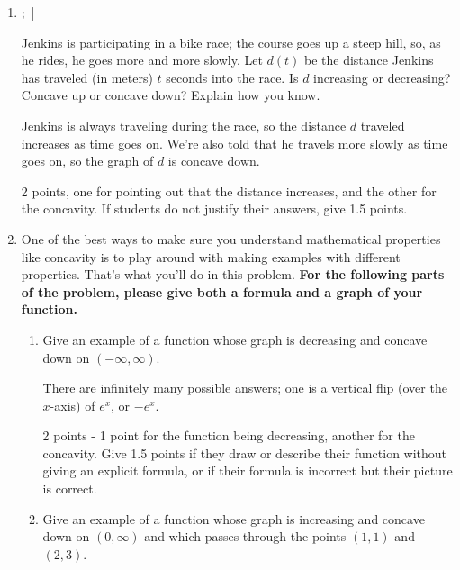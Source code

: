 \documentclass[10pt]{article}
\DeclareRobustCommand{\numbox}[1]{\tikz[overlay, baseline=-10pt, trapezium stretches=true] \node[trapezium, trapezium left angle=45, trapezium right angle=90, shape border rotate=90, anchor=north, text depth=1cm, inner ysep=8pt, fill=color1, text=white, font=\Large]{#1}; \,}
\DeclareRobustCommand{\shortnumbox}[1]{\tikz[overlay, baseline=-10pt, trapezium stretches=true] \node[trapezium, trapezium left angle=45, trapezium right angle=90, shape border rotate=90, anchor=north, inner ysep=8pt, fill=color1, text=white, font=\Large]{#1}; \,}
\begin{document}
\begin{enumerate}[leftmargin=*, label=\numbox{\arabic*}]
\item[\refstepcounter{enumi}\shortnumbox{\number\value{enumi}}]
    \begin{problem}
        Jenkins is participating in a bike race; the course goes up a steep
        hill, so, as he rides, he goes more and more slowly.  Let $d(t)$ be
        the distance Jenkins has traveled (in meters) $t$ seconds into the
        race.  Is $d$ increasing or decreasing?  Concave up or concave down?
        Explain how you know.
    \end{problem}

    \begin{solution}
        Jenkins is always traveling during the race, so the distance $d$
        traveled increases as time goes on.  We're also told that he travels
        more slowly as time goes on, so the graph of $d$ is concave down.
    \end{solution}
\begin{grading}
2 points, one for pointing out that the distance increases, and the other for the concavity. If students do not justify their answers, give 1.5 points. 
\end{grading}
\item
    One of the best ways to make sure you understand mathematical
    properties like concavity is to play around with making examples with
    different properties.  That's what you'll do in this problem. \textbf{For the following parts of the problem, please give both a formula and a graph of your function.}

    \begin{enumerate}
        \item
        \begin{problem}
            Give an example of a function whose graph is decreasing and concave
            down on $(-\infty, \infty)$.  
        \end{problem}

        \begin{solution}
            There are infinitely many possible answers; one is a vertical flip
            (over the $x$-axis) of $e^x$, or $\boxed{-e^x}$.
        \end{solution}
    \begin{grading}
    2 points - 1 point for the function being decreasing, another for the concavity. Give 1.5 points if they draw or describe their function without giving an explicit formula, or if their formula is incorrect but their picture is correct.
    \end{grading}
        \item
        \begin{problem}
            Give an example of a function whose graph is increasing and concave
            down on $(0, \infty)$ and which passes through the points $(1, 1)$
            and $(2, 3)$.
        \end{problem}


\end{enumerate}
\end{enumerate}
\end{document}
